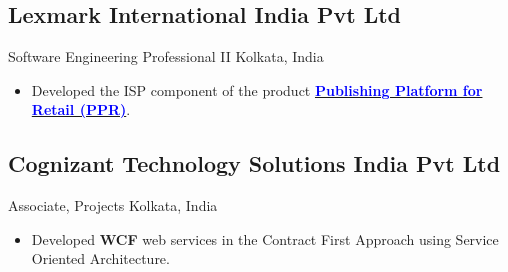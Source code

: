    \subsection{Lexmark International India Pvt Ltd}
      {}%
      {Software Engineering Professional II}%
      {Kolkata, India}%
      {}%
      {}
      \vspace{-1.5em}
      {
        \begin{itemize}[itemsep=0pt, parsep=0pt]
        \item Developed the ISP component of the product \href{https://infoserve.lexmark.com/ids/idv/video.aspx?category=All&productCode=PUBLISHING_PLATFORM_FOR_RETAIL&topic=v54408848&vId=PPR%2fLexmark-PPR-ISP-Overview-video&ar=16%3a9&l1=1&l2=1&sh=969&sw=1920&loc=en_US}
        {\textbf{\textcolor{blue}{Publishing Platform for Retail (PPR)}}}.
        \end{itemize}
      }
    
  
    \subsection{Cognizant Technology Solutions India Pvt Ltd}
      {}%
      {Associate, Projects}%
      {Kolkata, India}%
      {}%
      {}
      \vspace{-1.0em}
      {
        \begin{itemize}
        \item Developed \textbf{WCF} web services in the Contract First Approach using Service Oriented Architecture.
        \end{itemize}
      }
  
